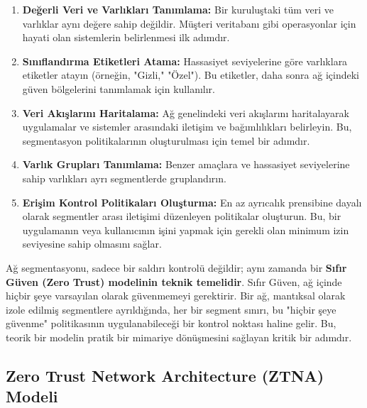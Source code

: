 \begin{enumerate}
\item \textbf{Değerli Veri ve Varlıkları Tanımlama:} Bir kuruluştaki tüm veri ve varlıklar aynı değere sahip değildir. Müşteri veritabanı gibi operasyonlar için hayati olan sistemlerin belirlenmesi ilk adımdır.
\item \textbf{Sınıflandırma Etiketleri Atama:} Hassasiyet seviyelerine göre varlıklara etiketler atayın (örneğin, "Gizli," "Özel"). Bu etiketler, daha sonra ağ içindeki güven bölgelerini tanımlamak için kullanılır.
\item \textbf{Veri Akışlarını Haritalama:} Ağ genelindeki veri akışlarını haritalayarak uygulamalar ve sistemler arasındaki iletişim ve bağımlılıkları belirleyin. Bu, segmentasyon politikalarının oluşturulması için temel bir adımdır.
\item \textbf{Varlık Grupları Tanımlama:} Benzer amaçlara ve hassasiyet seviyelerine sahip varlıkları ayrı segmentlerde gruplandırın.
\item \textbf{Erişim Kontrol Politikaları Oluşturma:} En az ayrıcalık prensibine dayalı olarak segmentler arası iletişimi düzenleyen politikalar oluşturun. Bu, bir uygulamanın veya kullanıcının işini yapmak için gerekli olan minimum izin seviyesine sahip olmasını sağlar.
\end{enumerate}

Ağ segmentasyonu, sadece bir saldırı kontrolü değildir; aynı zamanda bir \textbf{Sıfır Güven (Zero Trust) modelinin teknik temelidir}. Sıfır Güven, ağ içinde hiçbir şeye varsayılan olarak güvenmemeyi gerektirir. Bir ağ, mantıksal olarak izole edilmiş segmentlere ayrıldığında, her bir segment sınırı, bu "hiçbir şeye güvenme" politikasının uygulanabileceği bir kontrol noktası haline gelir. Bu, teorik bir modelin pratik bir mimariye dönüşmesini sağlayan kritik bir adımdır.

\subsection{Zero Trust Network Architecture (ZTNA) Modeli}


